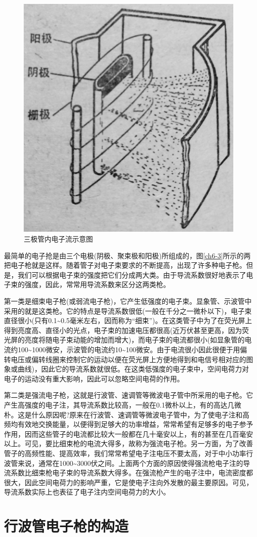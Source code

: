 \begin{figure}[phtb]
	\centering
	\includegraphics[width=0.3\linewidth]{figure/ch6-2}
	\caption{三极管内电子流示意图}
	\label{ch6-2}
\end{figure}


最简单的电子抢是由三个电极(阴极、聚束极和阳极)所组成的，图\ref{ch6-3}所示的两把电子枪就是这样。随着管子对电子束要求的不断提高，出现了许多种电子枪。但是，我们可以根据电子束的强度把它们分成两大类。由于导流系数很好地表示了电子束的强度，因此，常常用导流系数来区分这两类枪。

第一类是细束电子枪(或弱流电子枪)，它产生低强度的电子束。显象管、示波管中采用的就是这类枪。它的特点是导流系数很低(一般在千分之一微朴以下)，电子束直径很小(只有0.1\textasciitilde0.5毫米左右，因而称为“细束”)。在这类管子中为了在荧光屏上得到亮度高、直径小的光点，电子束的加速电压都很高(近万伏甚至更高，因为荧光屏的亮度将随电子束动能的增加而增大)，而电子束的电流都很小(如显象管的电流约100\textasciitilde1000微安，示波管的电流约10\textasciitilde100微安。由于电流很小因此很便于用偏转电压或偏转线圈来控制它的运动以便在荧光屏上方便地得到和电信号相对应的图象或曲线)，因此它的导流系数就很低。在这类低强度的电子束中，空间电荷力对电子的运动没有重大影响，因此可以忽略空间电荷的作用。

第二类是强流电子枪，这就是行波管、速调管等微波电子管中所采用的电子枪。它产生高强度的电子注，其导流系数比较高，一般在0.1微朴以上，有的高达几微朴。这是什么原因呢?原来在行波管、速调管等微波电子管中，为了使电子注和高频均有效地交换能量，以便得到足够大的功率增益，常常希望有足够多的电子参予作用，因而这些管子的电流都比较大一般都在几十毫安以上，有的甚至在几百毫安以上。可见，要比细束枪的电流大得多，故称为强流电子枪。另一方面，为了改善管子的高频性能、提高效率，我们常常希望电子注电压不要太高，对于中小功率行波管来说，通常在1000\textasciitilde3000伏之间。上面两个方面的原因使得强流枪电子注的导流系数比细束枪电子束的导流系数大得多。在强流枪产生的电子注中，电流密度都很大，因此空间电荷力的影响严重，它是使电子注向外发散的最主要原因。可见，导流系数实际上也表征了电子注内空间电荷力的大小。

\section{行波管电子枪的构造}



